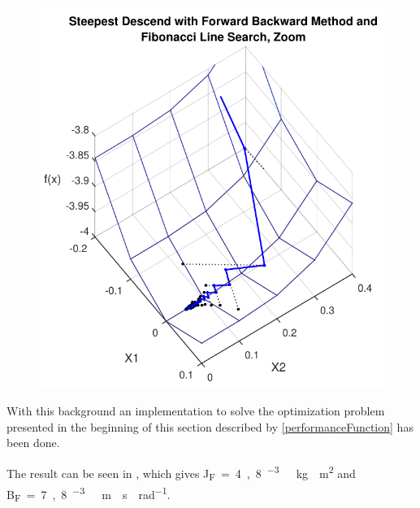 \begin{minipage}{\linewidth}
\begin{minipage}{0.45\linewidth}
\begin{figure}[H]
			\includegraphics[scale=.62]{figures/gradientForwardBackwardAndFibonacciZoom}
			\centering
			\captionsetup{justification=centering}
			\label{gradientForwardBackwardAndFibonacciZoom}
		\end{figure}
	\end{minipage}
\end{minipage}

With this background an implementation to solve the optimization problem presented in the beginning of this section described by \eqref{performanceFunction} has been done.

The result can be seen in , which gives \si{J_F=4,8 ^{-3}\ kg \cdot m^2} and \si{B_F=7,8 ^{-3}\ m \cdot s \cdot rad^{-1}}.

